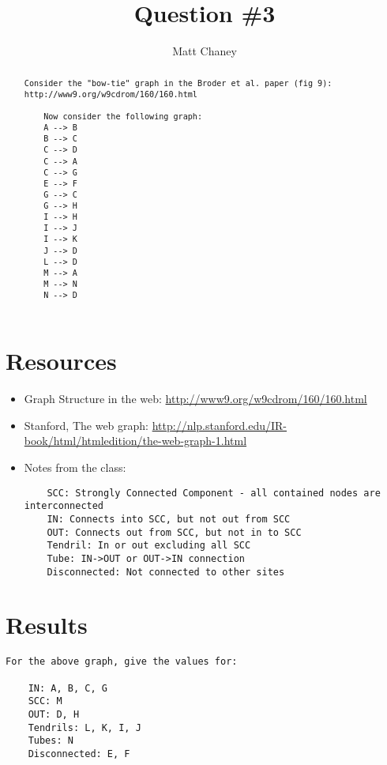 \documentclass[10pt,letterpaper]{article}
\begin{document}
\lstset{language=Python, basicstyle=\small}

\title{Question \#3}
\author{Matt Chaney}

\maketitle

\begin{abstract}
\begin{verbatim}
Consider the "bow-tie" graph in the Broder et al. paper (fig 9): 
http://www9.org/w9cdrom/160/160.html

    Now consider the following graph:
    A --> B
    B --> C
    C --> D
    C --> A
    C --> G
    E --> F
    G --> C
    G --> H
    I --> H
    I --> J
    I --> K
    J --> D 
    L --> D
    M --> A
    M --> N
    N --> D
\end{verbatim}
\end{abstract}

\section{Resources}
\begin{itemize}
\item Graph Structure in the web: \url{http://www9.org/w9cdrom/160/160.html}
\item Stanford, The web graph: \url{http://nlp.stanford.edu/IR-book/html/htmledition/the-web-graph-1.html}
\item Notes from the class:\begin{verbatim}
	SCC: Strongly Connected Component - all contained nodes are interconnected
	IN: Connects into SCC, but not out from SCC
	OUT: Connects out from SCC, but not in to SCC
	Tendril: In or out excluding all SCC
	Tube: IN->OUT or OUT->IN connection
	Disconnected: Not connected to other sites
	\end{verbatim}
\end{itemize}

\section{Results}
\begin{verbatim}
For the above graph, give the values for:

    IN: A, B, C, G
    SCC: M
    OUT: D, H
    Tendrils: L, K, I, J
    Tubes: N
    Disconnected: E, F

\end{verbatim}
\end{document}
